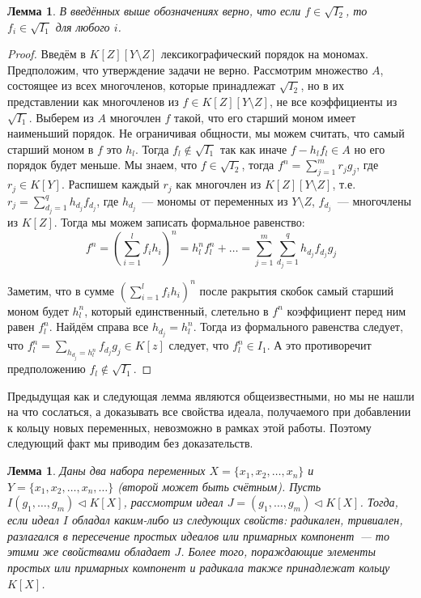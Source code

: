 \documentclass[16pt]{article}
\theoremstyle{plain1}
\newtheorem{lemma}[theorem1]{Лемма}
\theoremstyle{plain2}
\theoremstyle{plain}
\theoremstyle{plain3}
\theoremstyle{definition}
\theoremstyle{remark}
\begin{document}
\begin{lemma}\label{lemma:extention ring}
В введённых выше обозначениях верно, что  если $f\in \sqrt{I_2}$, то $f_i\in \sqrt{I_1}$ для любого $i$. 
\end{lemma}
\begin{proof}
Введём в $K[Z][Y\setminus Z]$ лексикографический порядок на мономах. Предположим, что утверждение задачи не верно. Рассмотрим множество $A$, состоящее из всех многочленов, которые принадлежат $\sqrt{I_2}$, но в их представлении как многочленов из $f\in K[Z][Y\setminus Z]$, не все коэффициенты из $ \sqrt{I_1}$.   Выберем из $A$ многочлен $f$ такой, что его старший моном имеет наименьший порядок. Не ограничивая общности, мы можем считать, что самый старший моном в $f$ это $h_l$. Тогда $f_l\not\in\sqrt{I_1}$ так как иначе $f-h_lf_l\in A$ но его порядок будет меньше. Мы знаем, что  $f\in \sqrt{I_2}$, тогда $f^n=\sum\limits_{j=1}^mr_jg_j$, где $r_j\in K[Y]$. Распишем каждый $r_j$ как многочлен из $K[Z][Y\setminus Z]$, т.е.  $r_j=\sum\limits_{d_j=1}^{q}h_{d_j}f_{d_j}$,  где $h_{d_j}$~--- мономы от переменных из $Y\setminus Z$, $f_{d_j}$~--- многочлены из $K[Z]$. Тогда мы можем записать формальное равенство: 
$$
f^n=(\sum\limits_{i=1}^lf_ih_i)^n=h_l^nf_l^n+\ldots=\sum\limits_{j=1}^m\sum\limits_{d_j=1}^{q}h_{d_j}f_{d_j}g_j
$$

Заметим, что в сумме $(\sum\limits_{i=1}^lf_ih_i)^n$ после ракрытия скобок самый старший моном будет $h_l^n$, который единственный, слетельно в $f^n$  коэффициент перед ним равен $f_l^n$. Найдём справа все $h_{d_j}= h_l^n$. Тогда из формального равенства следует, что $f_l^n=\sum\limits_{h_{d_j}= h_l^n}f_{d_j}g_j\in K[z]$ следует, что $f_l^n\in I_1$. А это противоречит предположению $f_l\not\in\sqrt{I_1}$.
\end{proof}


Предыдущая как и следующая лемма являются общеизвестными, но мы не нашли на что сослаться, а доказывать все свойства идеала, получаемого при добавлении к кольцу новых переменных, невозможно в рамках этой работы. Поэтому следующий факт мы приводим без доказательств.

\begin{lemma}\label{lemma:extention ring2}
Даны два набора переменных $X=\{x_1,x_2,\ldots,x_n\}$ и $Y=\{x_1,x_2,\ldots,x_n,\ldots\}$ (второй может быть счётным). Пусть $I(g_1,\ldots, g_m)\triangleleft K[X]$, рассмотрим идеал $J=(g_1,\ldots, g_m)\triangleleft K[X]$. Тогда, если идеал $I$ обладал каким-либо из следующих свойств: радикален, тривиален, разлагался в пересечение простых идеалов или примарных компонент~--- то этими же свойствами обладает $J$. Более того, пораждающие элементы простых или примарных компонент и радикала также принадлежат кольцу $ K[X]$. 
\end{lemma}
\end{document}
